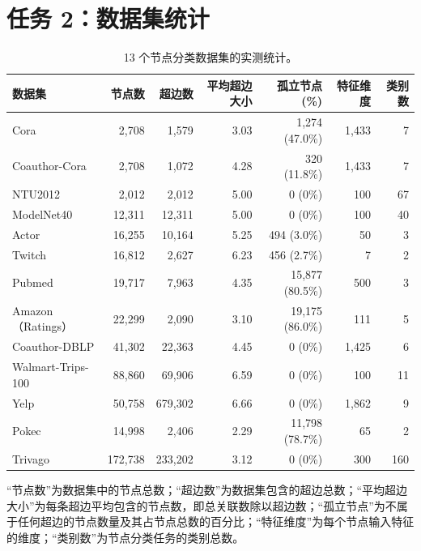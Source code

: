 \documentclass[11pt,a4paper]{article}
\begin{document}
\section*{任务 2：数据集统计}
\begin{table}[H]
\centering\small
\begin{tabular}{lrrrrrr}
\toprule
数据集 & 节点数 & 超边数 & 平均超边大小 & 孤立节点 (\%) & 特征维度 & 类别数 \\
\midrule
Cora              & 2{,}708 & 1{,}579 & 3.03 & 1{,}274 (47.0\%) & 1{,}433 & 7 \\
Coauthor-Cora     & 2{,}708 & 1{,}072 & 4.28 & 320 (11.8\%) & 1{,}433 & 7 \\
NTU2012           & 2{,}012 & 2{,}012 & 5.00 & 0 (0\%) & 100 & 67 \\
ModelNet40        & 12{,}311 & 12{,}311 & 5.00 & 0 (0\%) & 100 & 40 \\
Actor             & 16{,}255 & 10{,}164 & 5.25 & 494 (3.0\%) & 50 & 3 \\
Twitch            & 16{,}812 & 2{,}627 & 6.23 & 456 (2.7\%) & 7 & 2 \\
Pubmed            & 19{,}717 & 7{,}963 & 4.35 & 15{,}877 (80.5\%) & 500 & 3 \\
Amazon（Ratings） & 22{,}299 & 2{,}090 & 3.10 & 19{,}175 (86.0\%) & 111 & 5 \\
Coauthor-DBLP     & 41{,}302 & 22{,}363 & 4.45 & 0 (0\%) & 1{,}425 & 6 \\
Walmart-Trips-100 & 88{,}860 & 69{,}906 & 6.59 & 0 (0\%) & 100 & 11 \\
Yelp              & 50{,}758 & 679{,}302 & 6.66 & 0 (0\%) & 1{,}862 & 9 \\
Pokec             & 14{,}998 & 2{,}406 & 2.29 & 11{,}798 (78.7\%) & 65 & 2 \\
Trivago           & 172{,}738 & 233{,}202 & 3.12 & 0 (0\%) & 300 & 160 \\
\bottomrule
\end{tabular}
\caption{13 个节点分类数据集的实测统计。}
\label{tab:datasets}
\end{table}
\par{“节点数”为数据集中的节点总数；“超边数”为数据集包含的超边总数；“平均超边大小”为每条超边平均包含的节点数，即总关联数除以超边数；“孤立节点”为不属于任何超边的节点数量及其占节点总数的百分比；“特征维度”为每个节点输入特征的维度；“类别数”为节点分类任务的类别总数。}
\end{document}
